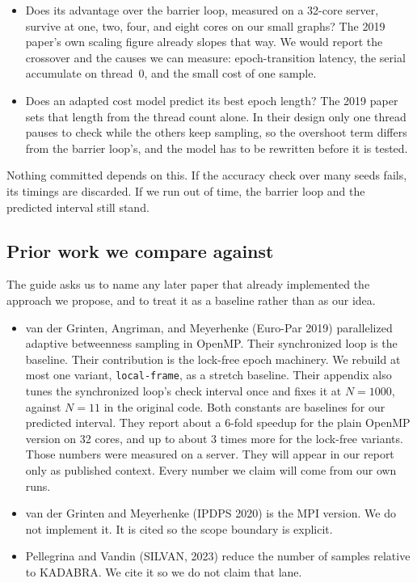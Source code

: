 \documentclass[11pt]{article}
\begin{document}
\begin{itemize}
\item Does its advantage over the barrier loop, measured on a 32-core server, survive at one, two, four, and eight cores on our small graphs? The 2019 paper's own scaling figure already slopes that way. We would report the crossover and the causes we can measure: epoch-transition latency, the serial accumulate on thread~0, and the small cost of one sample.
\item Does an adapted cost model predict its best epoch length? The 2019 paper sets that length from the thread count alone. In their design only one thread pauses to check while the others keep sampling, so the overshoot term differs from the barrier loop's, and the model has to be rewritten before it is tested.
\end{itemize}

Nothing committed depends on this. If the accuracy check over many seeds fails, its timings are discarded. If we run out of time, the barrier loop and the predicted interval still stand.

\subsection{Prior work we compare against}

The guide asks us to name any later paper that already implemented the approach we propose, and to treat it as a baseline rather than as our idea.

\begin{itemize}
\item van der Grinten, Angriman, and Meyerhenke (Euro-Par 2019) parallelized adaptive betweenness sampling in OpenMP. Their synchronized loop is the baseline. Their contribution is the lock-free epoch machinery. We rebuild at most one variant, \texttt{local-frame}, as a stretch baseline. Their appendix also tunes the synchronized loop's check interval once and fixes it at $N=1000$, against $N=11$ in the original code. Both constants are baselines for our predicted interval. They report about a 6-fold speedup for the plain OpenMP version on 32 cores, and up to about 3 times more for the lock-free variants. Those numbers were measured on a server. They will appear in our report only as published context. Every number we claim will come from our own runs.
\item van der Grinten and Meyerhenke (IPDPS 2020) is the MPI version. We do not implement it. It is cited so the scope boundary is explicit.
\item Pellegrina and Vandin (SILVAN, 2023) reduce the number of samples relative to KADABRA. We cite it so we do not claim that lane.
\end{itemize}
\end{document}
